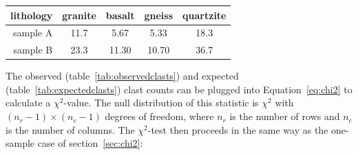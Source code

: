\begin{center}
  \begin{tabular}{r|cccc}
lithology & granite & basalt & gneiss & quartzite  \\ \hline
sample A & 11.7 & 5.67 & 5.33 & 18.3 \\
sample B & 23.3 & 11.30 & 10.70 & 36.7
  \end{tabular}
  \label{tab:expectedclasts}
\end{center}

The observed (table~\ref{tab:observedclasts}) and expected
(table~\ref{tab:expectedclasts}) clast counts can be plugged into
Equation~\ref{eq:chi2} to calculate a $\chi^2$-value. The null
distribution of this statistic is $\chi^2$ with $(n_r-1)\times(n_c-1)$
degrees of freedom, where $n_r$ is the number of rows and $n_c$ is the
number of columns.  The $\chi^2$-test then proceeds in the same way as
the one-sample case of section~\ref{sec:chi2}:

